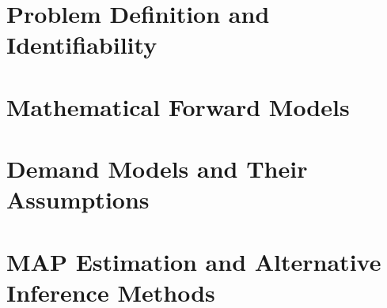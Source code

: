 
\part{Problem Definition and Identifiability}




\clearpage
\part{Mathematical Forward Models}








\clearpage
\part{Demand Models and Their Assumptions}







\clearpage
\part{MAP Estimation and Alternative Inference Methods}






